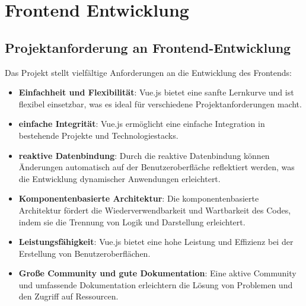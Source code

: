 \chapter{Frontend Entwicklung}


\section{Projektanforderung an Frontend-Entwicklung}

Das Projekt stellt vielfältige  Anforderungen an die Entwicklung des Frontends:

\begin{itemize}
	\item \textbf{Einfachheit und Flexibilität}:  Vue.js bietet eine sanfte Lernkurve und ist flexibel einsetzbar, was es ideal für verschiedene Projektanforderungen macht.
	
	\item \textbf{einfache Integrität}: Vue.js ermöglicht eine einfache Integration in bestehende Projekte und Technologiestacks.
	
	\item \textbf{reaktive Datenbindung}: Durch die reaktive Datenbindung können Änderungen automatisch auf der Benutzeroberfläche reflektiert werden, was die Entwicklung dynamischer Anwendungen erleichtert.
	
	\item \textbf{Komponentenbasierte Architektur}: Die komponentenbasierte Architektur fördert die Wiederverwendbarkeit und Wartbarkeit des Codes, indem sie die Trennung von Logik und Darstellung erleichtert.
	
	\item \textbf{Leistungsfähigkeit}: Vue.js bietet eine hohe Leistung und Effizienz bei der Erstellung von Benutzeroberflächen.
	
	\item \textbf{Große Community und gute Dokumentation}: Eine aktive Community und umfassende Dokumentation erleichtern die Lösung von Problemen und den Zugriff auf Ressourcen.
\end{itemize}

